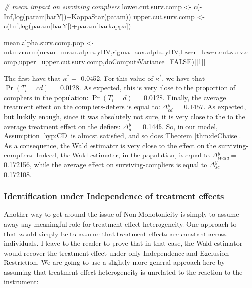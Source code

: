 \documentclass[
]{book}
\newenvironment{Shaded}{\begin{snugshade}}{\end{snugshade}}
\newcommand{\AttributeTok}[1]{\textcolor[rgb]{0.77,0.63,0.00}{#1}}
\newcommand{\CommentTok}[1]{\textcolor[rgb]{0.56,0.35,0.01}{\textit{#1}}}
\newcommand{\ConstantTok}[1]{\textcolor[rgb]{0.00,0.00,0.00}{#1}}
\newcommand{\DecValTok}[1]{\textcolor[rgb]{0.00,0.00,0.81}{#1}}
\newcommand{\FunctionTok}[1]{\textcolor[rgb]{0.00,0.00,0.00}{#1}}
\newcommand{\NormalTok}[1]{#1}
\newcommand{\OtherTok}[1]{\textcolor[rgb]{0.56,0.35,0.01}{#1}}
\newcommand{\SpecialCharTok}[1]{\textcolor[rgb]{0.00,0.00,0.00}{#1}}
\newcommand{\StringTok}[1]{\textcolor[rgb]{0.31,0.60,0.02}{#1}}
\theoremstyle{definition}
\theoremstyle{definition}
\theoremstyle{definition}
\theoremstyle{definition}
\theoremstyle{remark}
\begin{document}
\begin{Shaded}
\begin{Highlighting}[]
\CommentTok{\# mean impact on surviving compliers}
\NormalTok{lower.cut.surv.comp }\OtherTok{\textless{}{-}} \FunctionTok{c}\NormalTok{(}\SpecialCharTok{{-}}\ConstantTok{Inf}\NormalTok{,}\FunctionTok{log}\NormalTok{(param[}\StringTok{\textquotesingle{}barY\textquotesingle{}}\NormalTok{])}\SpecialCharTok{+}\FunctionTok{KappaStar}\NormalTok{(param))}
\NormalTok{upper.cut.surv.comp }\OtherTok{\textless{}{-}} \FunctionTok{c}\NormalTok{(}\ConstantTok{Inf}\NormalTok{,}\FunctionTok{log}\NormalTok{(param[}\StringTok{\textquotesingle{}barY\textquotesingle{}}\NormalTok{])}\SpecialCharTok{+}\NormalTok{param[}\StringTok{\textquotesingle{}barkappa\textquotesingle{}}\NormalTok{])}

\NormalTok{mean.alpha.surv.comp.pop }\OtherTok{\textless{}{-}} \FunctionTok{mtmvnorm}\NormalTok{(}\AttributeTok{mean=}\NormalTok{mean.alpha.yBV,}\AttributeTok{sigma=}\NormalTok{cov.alpha.yBV,}\AttributeTok{lower=}\NormalTok{lower.cut.surv.comp,}\AttributeTok{upper=}\NormalTok{upper.cut.surv.comp,}\AttributeTok{doComputeVariance=}\ConstantTok{FALSE}\NormalTok{)[[}\DecValTok{1}\NormalTok{]]}
\end{Highlighting}
\end{Shaded}

The first have that \(\kappa^*=\) 0.0452.
For this value of \(\kappa^*\), we have that \(\Pr(T_i=cd)=\) 0.0128.
As expected, this is very close to the proportion of compliers in the population: \(\Pr(T_i=d)=\) 0.0128.
Finally, the average treatment effect on the compliers-defiers is equal to: \(\Delta^y_{cd}=\) 0.1457.
As expected, but luckily enough, since it was absolutely not sure, it is very close to the to the average treatment effect on the defiers: \(\Delta^y_{d}=\) 0.1445.
So, in our model, Assumption \ref{hyp:CD} is almost satisfied, and so does Theorem \ref{thm:deChaise}.
As a consequence, the Wald estimator is very close to the effect on the surviving-compliers.
Indeed, the Wald estimator, in the population, is equal to \(\Delta^y_{Wald}=\) 0.172156, while the average effect on surviving-compliers is equal to \(\Delta^y_{sc}=\) 0.172108.

\hypertarget{identification-under-independence-of-treatment-effects}{%
\subsubsection{Identification under Independence of treatment effects}\label{identification-under-independence-of-treatment-effects}}

Another way to get around the issue of Non-Monotonicity is simply to assume away any meaningful role for treatment effect heterogeneity.
One approach to that would simply be to assume that treatment effects are constant across individuals.
I leave to the reader to prove that in that case, the Wald estimator would recover the treatment effect under only Independence and Exclusion Restriction.
We are going to use a slightly more general approach here by assuming that treatment effect heterogeneity is unrelated to the reaction to the instrument:
\end{document}
